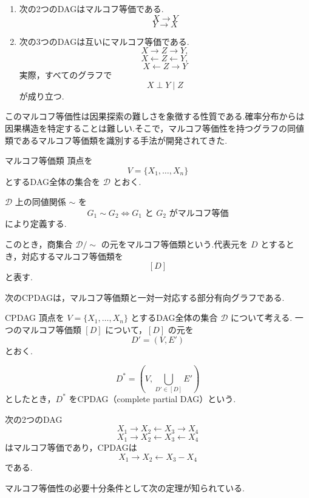 \documentclass[uplatex, dvipdfmx]{jsarticle}
\begin{document}
\begin{exm}{}
  \begin{enumerate}
    \item
      次の2つのDAGはマルコフ等価である.
      \[
        X \to Y
      \]
      \[
        Y \to X
      \]

    \item
      次の3つのDAGは互いにマルコフ等価である.
      \[
        X\to Z\to Y,
      \]
      \[
        X\leftarrow Z\leftarrow Y,
      \]
      \[
        X\leftarrow Z\to Y
      \]
      実際，すべてのグラフで
      \[
        X \perp Y \mid Z
      \]
      が成り立つ.
  \end{enumerate}
\end{exm}

このマルコフ等価性は因果探索の難しさを象徴する性質である.確率分布からは因果構造を特定することは難しい.そこで，マルコフ等価性を持つグラフの同値類であるマルコフ等価類を識別する手法が開発されてきた.

\begin{defn}{マルコフ等価類}
  頂点を
  \[
    V=\{X_1,\ldots,X_n\}
  \]
  とするDAG全体の集合を $\mathcal{D}$ とおく.

  $\mathcal{D}$ 上の同値関係 $\sim$ を
  \[
    G_1\sim G_2
    \iff
    G_1\text{ と }G_2\text{ がマルコフ等価}
  \]
  により定義する.

  このとき，商集合 $\mathcal{D}/\sim$ の元をマルコフ等価類という.代表元を $D$ とするとき，対応するマルコフ等価類を
  \[
    [D]
  \]
  と表す.
\end{defn}

次のCPDAGは，マルコフ等価類と一対一対応する部分有向グラフである.

\begin{defn}{CPDAG}
  頂点を $V=\{X_1,\ldots,X_n\}$ とするDAG全体の集合 $\mathcal{D}$ について考える.
  一つのマルコフ等価類 $[D]$ について，$[D]$ の元を
  \[
    D'=(V,E')
  \]
  とおく.

  \[
    D^*=
    \left(
      V,
      \bigcup_{D'\in [D]} E'
    \right)
  \]
  としたとき，$D^*$ をCPDAG（complete partial DAG）という.
\end{defn}

\begin{exm}{}
  次の2つのDAG
  \[
    X_1\to X_2\leftarrow X_3\to X_4
  \]
  \[
    X_1\to X_2\leftarrow X_3\leftarrow X_4
  \]
  はマルコフ等価であり，CPDAGは
  \[
    X_1\to X_2\leftarrow X_3 - X_4
  \]
  である.
\end{exm}

マルコフ等価性の必要十分条件として次の定理が知られている.
\end{document}
